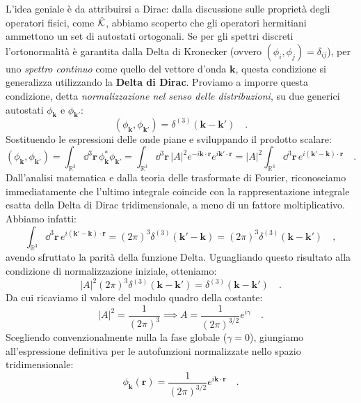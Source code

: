 L'idea geniale è da attribuirsi a Dirac: dalla discussione sulle proprietà degli operatori fisici, come $\hat{\mathcal{K}}$, abbiamo scoperto che gli operatori hermitiani ammettono un set di autostati ortogonali. Se per gli spettri discreti l'ortonormalità è garantita dalla Delta di Kronecker (ovvero $(\phi_i, \phi_j) = \delta_{ij}$), per uno \emph{spettro continuo} come quello del vettore d'onda $\bm{k}$, questa condizione si generalizza utilizzando la \textbf{Delta di Dirac}. Proviamo a imporre questa condizione, detta \emph{normalizzazione nel senso delle distribuzioni}, su due generici autostati $\phi_{\bm{k}}$ e $\phi_{\bm{k}'}$:
\[
    (\phi_{\bm{k}}, \phi_{\bm{k}'}) = \delta^{(3)}(\bm{k} - \bm{k}') \quad.
\]
Sostituendo le espressioni delle onde piane e sviluppando il prodotto scalare:
\[
    (\phi_{\bm{k}}, \phi_{\bm{k}'}) = \int_{\mathbb{R}^3} \dd^3{\bm{r}}\, \phi_{\bm{k}}^* \phi_{\bm{k}'} = \int_{\mathbb{R}^3} \dd^3{\bm{r}}\, |A|^2 e^{-i\bm{k}\cdot \bm{r}} e^{i\bm{k}'\cdot \bm{r}} = |A|^2 \int_{\mathbb{R}^3} \dd^3{\bm{r}}\, e^{i(\bm{k}'-\bm{k})\cdot \bm{r}} \quad.
\]
Dall'analisi matematica e dalla teoria delle trasformate di Fourier, riconosciamo immediatamente che l'ultimo integrale coincide con la rappresentazione integrale esatta della Delta di Dirac tridimensionale, a meno di un fattore moltiplicativo. Abbiamo infatti:
\[
    \int_{\mathbb{R}^3} \dd^3{\bm{r}}\, e^{i(\bm{k}'-\bm{k})\cdot \bm{r}} = (2\pi)^3 \delta^{(3)}(\bm{k}' - \bm{k}) = (2\pi)^3 \delta^{(3)}(\bm{k} - \bm{k}') \quad,
\]
avendo sfruttato la parità della funzione Delta. Uguagliando questo risultato alla condizione di normalizzazione iniziale, otteniamo:
\[
    |A|^2 (2\pi)^3 \delta^{(3)}(\bm{k} - \bm{k}') = \delta^{(3)}(\bm{k} - \bm{k}') \quad.
\]
Da cui ricaviamo il valore del modulo quadro della costante:
\[
    |A|^2 = \frac{1}{(2\pi)^3} \implies A = \frac{1}{(2\pi)^{3/2}} e^{i\gamma} \quad.
\]
Scegliendo convenzionalmente nulla la fase globale ($\gamma = 0$), giungiamo all'espressione definitiva per le autofunzioni normalizzate nello spazio tridimensionale:
\begin{equation}
    \phi_{\bm{k}}(\bm{r}) = \frac{1}{(2\pi)^{3/2}} e^{i\bm{k}\cdot \bm{r}} \quad.
\end{equation}

